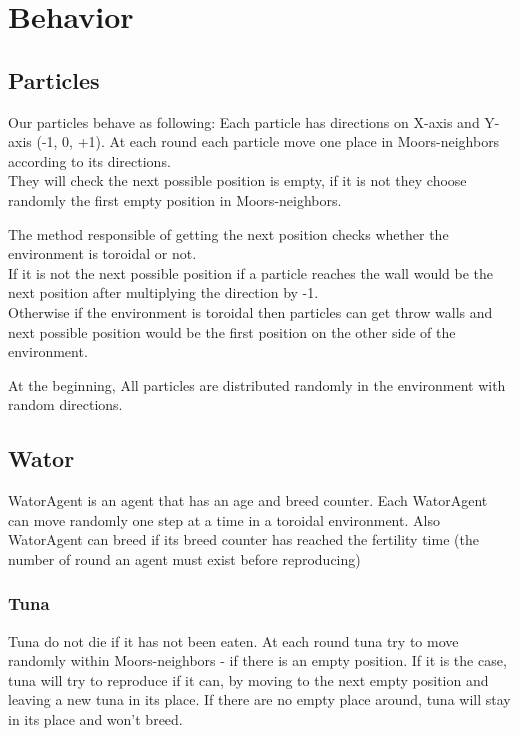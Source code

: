\section{Behavior}
\label{sec:Behavior}
\subsection{Particles}
Our particles behave as following: Each particle has directions on X-axis and Y-axis (-1, 0, +1). At each round each particle move one place in Moors-neighbors\cite{moore} according to its directions.\\
They will check the next possible position is empty, if it is not they choose randomly the first empty position in Moors-neighbors.

The method responsible of getting the next position checks whether the environment is toroidal or not.\\
If it is not the next possible position if a particle reaches the wall would be the next position after multiplying the direction by -1.\\ Otherwise if the environment is toroidal then particles can get throw walls and next possible position would be the first position on the other side of the environment.

At the beginning, All particles are distributed randomly in the environment with random directions.

\subsection{Wator}
WatorAgent is an agent that has an age and breed counter.  Each WatorAgent can move randomly one step at a time in a toroidal environment. Also WatorAgent can breed if its breed counter has reached the fertility time (the number of round an agent must exist before reproducing)
\subsubsection{Tuna}
Tuna do not die if it has not been eaten. At each round tuna try to move randomly within Moors-neighbors - if there is an empty position. If it is the case, tuna will try to reproduce if it can, by moving to the next empty position and leaving a new tuna in its place. If there are no empty place around, tuna will stay in its place and won't breed.

